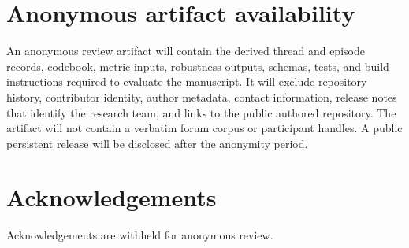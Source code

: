 \section*{Anonymous artifact availability}

An anonymous review artifact will contain the derived thread and episode records, codebook, metric inputs, robustness outputs, schemas, tests, and build instructions required to evaluate the manuscript. It will exclude repository history, contributor identity, author metadata, contact information, release notes that identify the research team, and links to the public authored repository. The artifact will not contain a verbatim forum corpus or participant handles. A public persistent release will be disclosed after the anonymity period.

\section*{Acknowledgements}

Acknowledgements are withheld for anonymous review.
